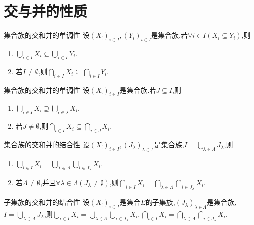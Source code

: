 \section{交与并的性质}

\begin{proposition}{集合族的交和并的单调性}{}
	设$\left(X_{i}\right)_{i\in I},\left(Y_{i}\right)_{i\in I}$是集合族.若$\forall i\in I\left(X_{i}\subseteq Y_{i}\right)$,则
	\begin{enumerate}
		\item $\bigcup\limits_{i\in I}X_{i}\subseteq\bigcup\limits_{i\in I}Y_{i}$.
		\item 若$I\neq\emptyset$,则$\bigcap\limits_{i\in I}X_{i}\subseteq\bigcap\limits_{i\in I}Y_{i}$.
	\end{enumerate}
\end{proposition}

\begin{proposition}{集合族的交和并的单调性}{}
	设$\left(X_{i}\right)_{i\in I}$是集合族.若$J\subseteq I$,则
	\begin{enumerate}
		\item $\bigcup\limits_{i\in I}X_{i}\supseteq\bigcup\limits_{i\in J}X_{i}$.
		\item 若$J\neq\emptyset$,则$\bigcap\limits_{i\in I}X_{i}\subseteq\bigcap\limits_{i\in J}X_{i}$.
	\end{enumerate}
\end{proposition}

\begin{proposition}{集合族的交和并的结合性}{}
	设$\left(X_{i}\right)_{i\in I},\left(J_{\lambda}\right)_{\lambda\in\Lambda}$是集合族,$I=\bigcup\limits_{\lambda\in\Lambda}J_{\lambda}$,则
	\begin{enumerate}
		\item $\bigcup\limits_{i\in I}X_{i}=\bigcup\limits_{\lambda\in\Lambda}\bigcup\limits_{i\in J_{\lambda}}X_{i}$.
		\item 若$\Lambda\neq\emptyset$,并且$\forall\lambda\in\Lambda\left(J_{\lambda}\neq\emptyset\right)$,则$\bigcap\limits_{i\in I}X_{i}=\bigcap\limits_{\lambda\in\Lambda}\bigcap\limits_{i\in J_{\lambda}}X_{i}$.
	\end{enumerate}
\end{proposition}

\begin{corollary}{子集族的交和并的结合性}{}
	设$\left(X_{i}\right)_{i\in I}$是集合$E$的子集族,$\left(J_{\lambda}\right)_{\lambda\in\Lambda}$是集合族,$I=\bigcup\limits_{\lambda\in\Lambda}J_{\lambda}$,则$\bigcup\limits_{i\in I}X_{i}=\bigcup\limits_{\lambda\in\Lambda}\bigcup\limits_{i\in J_{\lambda}}X_{i},\bigcap\limits_{i\in I}X_{i}=\bigcap\limits_{\lambda\in\Lambda}\bigcap\limits_{i\in J_{\lambda}}X_{i}$.
\end{corollary}
